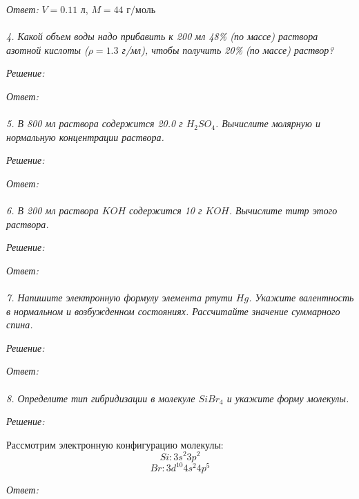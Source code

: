 \emph{Ответ: } \( V = 0.11 \text{ л} \), 
\( M = 44 \text{ г/моль} \) \\\\


\emph{4. Какой объем воды надо прибавить к 200 мл 48\% (по массе) 
раствора азотной кислоты (\(\rho = 1.3 \) г/мл), чтобы получить 
20\% (по массе) раствор?}

\emph{Решение:}

\emph{Ответ: } \\\\


\emph{5. В 800 мл раствора содержится 20.0 г \( H_2 SO_4 \). Вычислите 
молярную и нормальную концентрации раствора.}

\emph{Решение:}

\emph{Ответ: } \\\\


\emph{6. В 200 мл раствора \( KOH \) содержится 10 г \( KOH \). 
Вычислите титр этого раствора.}

\emph{Решение:}

\emph{Ответ: } \\\\


\emph{7. Напишите электронную формулу элемента ртути \( Hg \). Укажите 
валентность в нормальном и возбужденном состояниях. Рассчитайте значение 
суммарного спина.}

\emph{Решение:}

\emph{Ответ: } \\\\


\emph{8. Определите тип гибридизации в молекуле \( SiBr_4 \) и укажите 
форму молекулы.}

\emph{Решение:}

Рассмотрим электронную конфигурацию молекулы:
\[ Si: 3s^2 3p^2 \]
\[ Br: 3d^10 4s^2 4p^5 \]

\emph{Ответ: } \\\\

